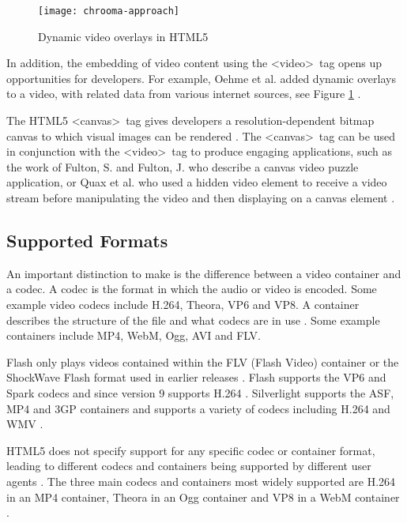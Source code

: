 \documentclass[journal]{IEEEtran}
\begin{document}
\begin{figure}[!t]
\centering
\texttt{[image: chrooma-approach]}
\caption{Dynamic video overlays in HTML5 \cite{inproceedings:theChroomaApproach}}
\label{fig:chroomaApproach}
\end{figure} 

In addition, the embedding of video content using the \textless video\textgreater~tag opens up opportunities for developers. For example, Oehme et al. added dynamic overlays to a video, with related data from various internet sources, see Figure \ref{fig:chroomaApproach} \cite{inproceedings:theChroomaApproach}.

The HTML5 \textless canvas\textgreater~tag gives developers a resolution-dependent bitmap canvas to which visual images can be rendered \cite{standard:html5}. The \textless canvas\textgreater~tag can be used in conjunction with the \textless video\textgreater~tag to produce engaging applications, such as the work of Fulton, S. and Fulton, J. who describe a canvas video puzzle application, or Quax et al. who used a hidden video element to receive a video stream before manipulating the video and then displaying on a canvas element \cite{book:html5canvas}\cite{inproceedings:aPracticalAndScableMethodForStreaming}.

\subsection{Supported Formats}
An important distinction to make is the difference between a video container and a codec. A codec is the format in which the audio or video is encoded. Some example video codecs include H.264, Theora, VP6 and VP8. A container describes the structure of the file and what codecs are in use \cite{website:videoFormatsGuide}. Some example containers include MP4, WebM, Ogg, AVI and FLV.

Flash only plays videos contained within the FLV (Flash Video) container or the ShockWave Flash format used in earlier releases \cite{article:flashPlayer}. Flash supports the VP6 and Spark codecs and since version 9 supports H.264 \cite{article:flashPlayer}\cite{website:flashSupportedFormats}. Silverlight supports the ASF, MP4 and 3GP containers and supports a variety of codecs including H.264 and WMV \cite{website:silverlightSupportedFormats}.

HTML5 does not specify support for any specific codec or container format, leading to different codecs and containers being supported by different user agents \cite{article:towardsVideoOnTheWebWithHTML5}. The three main codecs and containers most widely supported are H.264 in an MP4 container, Theora in an Ogg container and VP8 in a WebM container \cite{article:towardsVideoOnTheWebWithHTML5}.
\end{document}

